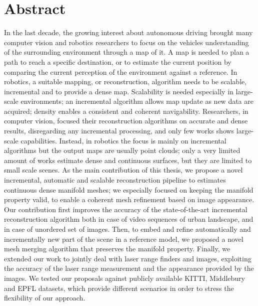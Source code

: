 \chapter*{Abstract}
\vspace{-5pt}

 

In the last decade, the growing interest about autonomous driving brought many computer vision and robotics researchers to focus on the  vehicles understanding of the surrounding environment through a map of it.
A map is needed to plan a path to reach a specific destination, or to estimate the current position by comparing the current perception of the environment against a reference.
In robotics, a suitable mapping, or reconstruction, algorithm needs  to be scalable, incremental and to provide a dense map. 
Scalability is needed especially in large-scale environments; an incremental algorithm allows map update as new data are acquired; density enables a consistent and coherent navigability.
Researchers, in computer vision, focused their reconstruction algorithms on accurate and dense results, disregarding any incremental processing, and only few works shows large-scale capabilities.  
Instead, in robotics the focus is mainly on incremental algorithms but the output maps are usually point clouds; only a very limited amount of works estimate dense and continuous surfaces, but they are limited to small scale scenes.
As the main contribution of this thesis, we propose a novel incremental, automatic and scalable reconstruction  pipeline to estimates continuous dense manifold meshes; we especially focused on keeping the manifold property valid, to enable a coherent mesh refinement based on image appearance.  
Our contribution first improves the accuracy of the state-of-the-art incremental reconstruction algorithm both in case of video sequences of urban landscape, and in case of unordered set of images.
Then, to embed and refine automatically and incrementally new part of the scene in a reference  model, we proposed a novel mesh merging algorithm that preserves the manifold property.
Finally, we extended our work to jointly deal with laser range finders and images, exploiting the accuracy of the laser range measurement and the appearance provided by the images.
We tested our proposals against publicly available KITTI, Middlebury and EPFL datasets, which provide different scenarios in order to stress the flexibility of our approach.

